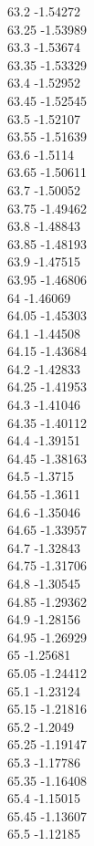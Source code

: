 {63.2	-1.54272\\
63.25	-1.53989\\
63.3	-1.53674\\
63.35	-1.53329\\
63.4	-1.52952\\
63.45	-1.52545\\
63.5	-1.52107\\
63.55	-1.51639\\
63.6	-1.5114\\
63.65	-1.50611\\
63.7	-1.50052\\
63.75	-1.49462\\
63.8	-1.48843\\
63.85	-1.48193\\
63.9	-1.47515\\
63.95	-1.46806\\
64	-1.46069\\
64.05	-1.45303\\
64.1	-1.44508\\
64.15	-1.43684\\
64.2	-1.42833\\
64.25	-1.41953\\
64.3	-1.41046\\
64.35	-1.40112\\
64.4	-1.39151\\
64.45	-1.38163\\
64.5	-1.3715\\
64.55	-1.3611\\
64.6	-1.35046\\
64.65	-1.33957\\
64.7	-1.32843\\
64.75	-1.31706\\
64.8	-1.30545\\
64.85	-1.29362\\
64.9	-1.28156\\
64.95	-1.26929\\
65	-1.25681\\
65.05	-1.24412\\
65.1	-1.23124\\
65.15	-1.21816\\
65.2	-1.2049\\
65.25	-1.19147\\
65.3	-1.17786\\
65.35	-1.16408\\
65.4	-1.15015\\
65.45	-1.13607\\
65.5	-1.12185\\
}

